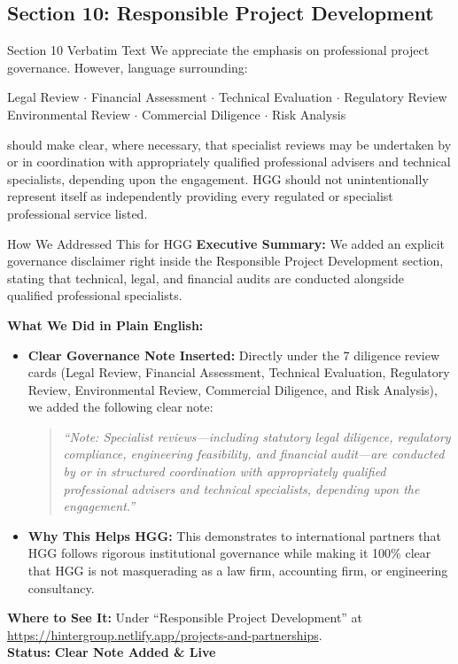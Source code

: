 \documentclass[11pt,a4paper]{article}
\begin{document}
\subsection{Section 10: Responsible Project Development}

\begin{VerbatimClientBox}{Section 10 Verbatim Text}
We appreciate the emphasis on professional project governance.
However, language surrounding:
\begin{center}
Legal Review $\cdot$ Financial Assessment $\cdot$ Technical Evaluation $\cdot$ Regulatory Review \\
Environmental Review $\cdot$ Commercial Diligence $\cdot$ Risk Analysis
\end{center}
should make clear, where necessary, that specialist reviews may be undertaken by or in coordination with appropriately qualified professional advisers and technical specialists, depending upon the engagement.
HGG should not unintentionally represent itself as independently providing every regulated or specialist professional service listed.
\end{VerbatimClientBox}

\begin{DetailedResolutionBox}{How We Addressed This for HGG}
\textbf{Executive Summary:} We added an explicit governance disclaimer right inside the Responsible Project Development section, stating that technical, legal, and financial audits are conducted alongside qualified professional specialists.

\textbf{What We Did in Plain English:}
\begin{itemize}
    \item \textbf{Clear Governance Note Inserted:} Directly under the 7 diligence review cards (Legal Review, Financial Assessment, Technical Evaluation, Regulatory Review, Environmental Review, Commercial Diligence, and Risk Analysis), we added the following clear note:
    \begin{quote}
    \small
    \textit{``Note: Specialist reviews---including statutory legal diligence, regulatory compliance, engineering feasibility, and financial audit---are conducted by or in structured coordination with appropriately qualified professional advisers and technical specialists, depending upon the engagement.''}
    \end{quote}
    \item \textbf{Why This Helps HGG:} This demonstrates to international partners that HGG follows rigorous institutional governance while making it 100\% clear that HGG is not masquerading as a law firm, accounting firm, or engineering consultancy.
\end{itemize}

\textbf{Where to See It:} Under ``Responsible Project Development'' at \url{https://hintergroup.netlify.app/projects-and-partnerships}. \\
\textbf{Status:} \textcolor{HGGGreen}{\textbf{Clear Note Added \& Live}}
\end{DetailedResolutionBox}
\end{document}
